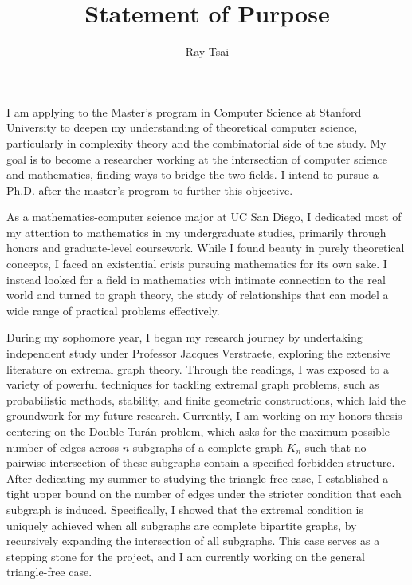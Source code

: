 \documentclass[12pt]{article}
\title{Statement of Purpose}
\author{Ray Tsai}
\date{}
\begin{document}
\maketitle

\vspace{-0.25in}

I am applying to the Master's program in Computer Science at Stanford University to deepen my
understanding of theoretical computer science, particularly in complexity theory and the
combinatorial side of the study. My goal is to become a researcher working at the intersection of
computer science and mathematics, finding ways to bridge the two fields. I intend to pursue a Ph.D.
after the master's program to further this objective.

As a mathematics-computer science major at UC San Diego, I dedicated most of my attention to
mathematics in my undergraduate studies, primarily through honors and graduate-level coursework.
While I found beauty in purely theoretical concepts, I faced an existential crisis pursuing
mathematics for its own sake. I instead looked for a field in mathematics with intimate connection
to the real world and turned to graph theory, the study of relationships that can model a wide range
of practical problems effectively.

During my sophomore year, I began my research journey by undertaking independent study under
Professor Jacques Verstraete, exploring the extensive literature on extremal graph theory. Through
the readings, I was exposed to a variety of powerful techniques for tackling extremal graph
problems, such as probabilistic methods, stability, and finite geometric constructions, which laid
the groundwork for my future research. Currently, I am working on my honors thesis centering on the
Double Turán problem, which asks for the maximum possible number of edges across $n$ subgraphs of a
complete graph $K_n$ such that no pairwise intersection of these subgraphs contain a specified
forbidden structure. After dedicating my summer to studying the triangle-free case, I established a
tight upper bound on the number of edges under the stricter condition that each subgraph is induced.
Specifically, I showed that the extremal condition is uniquely achieved when all subgraphs are
complete bipartite graphs, by recursively expanding the intersection of all subgraphs. This case
serves as a stepping stone for the project, and I am currently working on the general triangle-free
case. 
\end{document}
